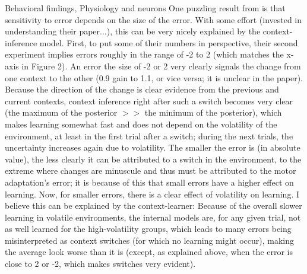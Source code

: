 \documentclass{report}
\begin{document}
\begin{chapter}{Behavioral findings, Physiology and neurons}
One puzzling result from \citep{Herzfeld_memory_2014} is that sensitivity to
error depends on the size of the error. With some effort (invested in
understanding their paper...), this can be very nicely explained by the
context-inference model. First, to put some of their numbers in perspective,
their second experiment implies errors roughly in the range of -2 to 2 (which
matches the x-axis in Figure 2). An error the size of -2 or 2 very clearly
signals the change from one context to the other (0.9 gain to 1.1, or vice
versa; it is unclear in the paper). Because the direction of the change is
clear evidence from the previous and current contexts, context inference right
after such a switch becomes very clear (the maximum of the posterior $>>$ the
minimum of the posterior), which makes learning somewhat fast and does not
depend on the volatility of the environment, at least in the first trial after
a switch; during the next trials, the uncertainty increases again due to
volatility. The smaller the error is (in absolute value), the less clearly it
can be attributed to a switch in the environment, to the extreme where changes
are minuscule and thus must be attributed to the motor adaptation's error; it
is because of this that small errors have a higher effect on learning. Now, for
smaller errors, there is a clear effect of volatility on learning. I believe
this can be explained by the context-learner: Because of the overall slower
learning in volatile environments, the internal models are, for any given
trial, not as well learned for the high-volatility groups, which leads to many
errors being misinterpreted as context switches (for which no learning might
occur), making the average look worse than it is (except, as explained above,
when the error is close to 2 or -2, which makes switches very evident).


\end{chapter}
\end{document}
